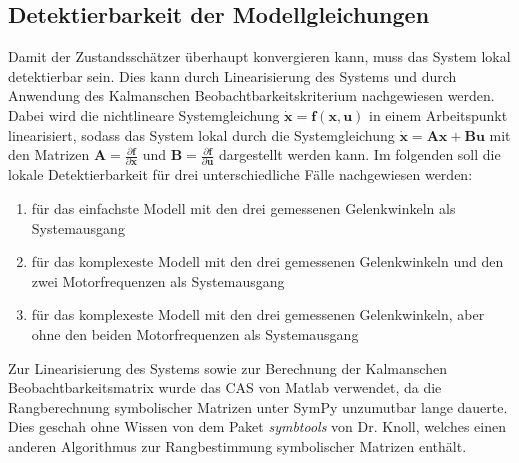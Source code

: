 \documentclass[times, 10pt,twocolumn]{article}
\begin{document}
	\subsection{Detektierbarkeit der Modellgleichungen}
	Damit der Zustandsschätzer überhaupt konvergieren kann, muss das System lokal detektierbar sein. Dies kann durch Linearisierung des Systems und durch Anwendung des Kalmanschen Beobachtbarkeitskriterium nachgewiesen werden. Dabei wird die nichtlineare Systemgleichung  $ \bm{\dot x} = \bm{f}(\bm{x},\bm{u}) $ in einem Arbeitspunkt linearisiert, sodass das System lokal durch die Systemgleichung $ \bm{\dot x} = \bm{A} \bm{x} + \bm{B} \bm{u} $ mit den Matrizen $ \bm A = \frac{\partial{ \bm f}}{\partial{\bm x}} $ und $ \bm B = \frac{\partial{ \bm f}}{\partial{\bm u}} $ dargestellt werden kann. Im folgenden soll die lokale Detektierbarkeit für drei unterschiedliche Fälle nachgewiesen werden:
	\begin{enumerate}
	\item für das einfachste Modell mit den drei gemessenen Gelenkwinkeln als Systemausgang
	\item für das komplexeste Modell mit den drei gemessenen Gelenkwinkeln und den zwei Motorfrequenzen als Systemausgang
	\item für das komplexeste Modell mit den drei gemessenen Gelenkwinkeln, aber ohne den beiden Motorfrequenzen als Systemausgang
	\end{enumerate}
	Zur Linearisierung des Systems sowie zur Berechnung der Kalmanschen Beobachtbarkeitsmatrix wurde das CAS von Matlab verwendet, da die Rangberechnung symbolischer Matrizen unter SymPy unzumutbar lange dauerte. Dies geschah ohne Wissen von dem Paket \textit{symbtools} von Dr. Knoll, welches einen anderen Algorithmus zur Rangbestimmung symbolischer Matrizen enthält. 
\end{document}
